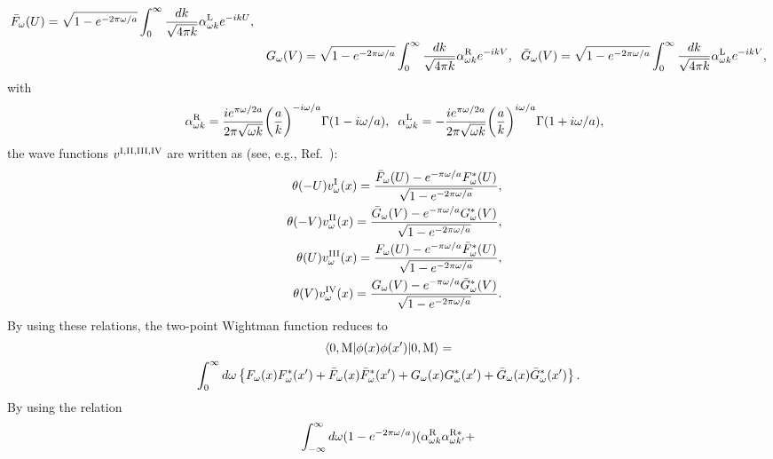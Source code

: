 \documentclass[aps,prd,preprintnumbers,nofootinbib,showpacs,11pt]{revtex4}%
\begin{document}
\begin{widetext}
\begin{eqnarray}
\bar F_\omega(U)=\sqrt{1-e^{-2\pi\omega/a}}\int_0^\infty {dk\over \sqrt{4\pi k}} \alpha_{\omega k}^{\rm L} e^{-ik U},
\nonumber\\ 
&&G_\omega(V)=\sqrt{1-e^{-2\pi\omega/a}}\int_0^\infty {dk\over \sqrt{4\pi k}} \alpha_{\omega k}^{\rm R} e^{-ik V},
\hspace{2mm}
\bar G_\omega(V)=\sqrt{1-e^{-2\pi\omega/a}}\int_0^\infty {dk\over \sqrt{4\pi k}} \alpha_{\omega k}^{\rm L} e^{-ik V},
\nonumber
\end{eqnarray}
with
\begin{eqnarray}
&& \alpha_{\omega k}^{\rm R}={ie^{\pi\omega/2a}\over 2\pi\sqrt{\omega k}}\biggl({a\over k}\biggr)^{-i\omega/a}\Gamma(1-i\omega/a),
\hspace{2mm}
\alpha_{\omega k}^{\rm L}=-{ie^{\pi\omega/2a}\over 2\pi\sqrt{\omega k}}\biggl({a\over k}\biggr)^{i\omega/a}\Gamma(1+i\omega/a),
\nonumber
\end{eqnarray}
the wave functions $v^{\rm I, II, III, IV}$
 are written as (see, e.g.,  Ref.~\cite{Higuchi}):
\begin{eqnarray}
&&\theta(-U)v^{\rm I}_{\omega}(x)
=  \frac{\bar F_{\omega}(U) - e^{-\pi\omega/a} F_{\omega}^{*}(U)}{\sqrt{1 - e^{-2\pi\omega/a}}},
\label{eqfiveai2}
\\
&&\theta(-V)v^{\rm II}_{\omega}(x)
 =  \frac{\bar G_{\omega}(V) - e^{-\pi\omega/a}G_{\omega}^{*}(V)}{\sqrt{1-e^{-2\pi \omega/a}}},
\label{eqsixai2}
\\
&&\theta(U)v^{\rm III}_{\omega}(x)
=  \frac{F_{\omega}(U) - e^{-\pi\omega/a}\bar F_{\omega}^{*}(U)}{\sqrt{1 - e^{-2\pi\omega/a}}},
\label{eqsevenai2}
\\
&&\theta(V)v^{\rm IV}_{\omega}(x)
 =  \frac{G_{\omega}(V) - e^{-\pi\omega/a}\bar G_{\omega}^{*}(V)}{\sqrt{1-e^{-2\pi \omega/a}}} .
\label{eqnineai2}
\end{eqnarray}
By using these relations, the two-point Wightman function reduces to
\begin{multline}
\langle0,{\rm M}|\phi(x)\phi(x')|0,{\rm M}\rangle =\\
\int_0^{\infty}d\omega\left\{ F_{\omega}(x)F^*_{\omega}(x')+\bar F_{\omega}(x)\bar F^*_{\omega}(x')
    +G_{\omega}(x)G^*_{\omega}(x')+\bar G_{\omega}(x)\bar G^*_{\omega}(x')
    \right\}.
    \label{FFFFGGGG}
\end{multline}
By using the relation
\begin{equation*}
  \int_{-\infty}^\infty d\omega(1-e^{-2\pi\omega/a})(\alpha_{\omega k}^{\rm R}\alpha_{\omega k'}^{\rm R*}+

\end{equation*}
\end{widetext}
\end{document}
